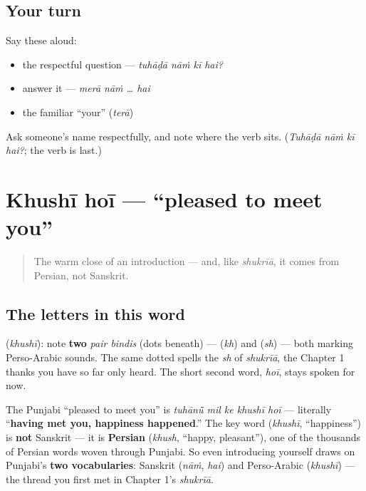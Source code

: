 \subsection*{Your turn}
Say these aloud:

\begin{itemize}
\raggedright
  \item the respectful question — \emph{tuhāḍā nāṁ kī hai?}
  \item answer it — \emph{merā nāṁ … hai}
  \item the familiar \textquotedblleft{}your\textquotedblright{} (\emph{terā})
\end{itemize}

\begin{tcolorbox}[breakable,colback=teal!4,colframe=teal!35!black,title={Before you move on}]
Ask someone's name respectfully, and note where the verb sits. (\emph{Tuhāḍā nāṁ kī hai?}; the verb is last.)
\end{tcolorbox}
\section[\texorpdfstring{\pa{ਖ਼ੁਸ਼ੀ} \pa{ਹੋਈ} (khushī hoī)}{ਖ਼ੁਸ਼ੀ ਹੋਈ (khushī hoī)}]{Khushī hoī — \textquotedblleft{}pleased to meet you\textquotedblright{}}

\label{lesson:PA-C02-khushi}



\begin{quote}
The warm close of an introduction — and, like \emph{shukrīā}, it comes from Persian, not Sanskrit.
\end{quote}

\subsection*{The letters in this word}
\textbf{} (\emph{khushī}): note \textbf{two} \emph{pair bindis} (dots beneath) — \textbf{} (\emph{kh}) and \textbf{} (\emph{sh}) — both marking Perso-Arabic sounds. The same dotted \textbf{} spells the \emph{sh} of \emph{shukrīā}, the Chapter 1 thanks you have so far only heard. The short second word, \emph{hoī}, stays spoken for now.

\begin{cousinweb}
The Punjabi \textquotedblleft{}pleased to meet you\textquotedblright{} is \emph{tuhānū̃ mil ke khushī hoī} — literally \textquotedblleft{}\textbf{having met you, happiness happened}.\textquotedblright{} The key word \textbf{} (\emph{khushī}, \textquotedblleft{}happiness\textquotedblright{}) is \textbf{not} Sanskrit — it is \textbf{Persian} (\emph{khush}, \textquotedblleft{}happy, pleasant\textquotedblright{}), one of the thousands of Persian words woven through Punjabi. So even introducing yourself draws on Punjabi's \textbf{two vocabularies}: Sanskrit (\emph{nāṁ}, \emph{hai}) and Perso-Arabic (\emph{khushī}) — the thread you first met in Chapter 1's \emph{shukrīā}.
\end{cousinweb}

